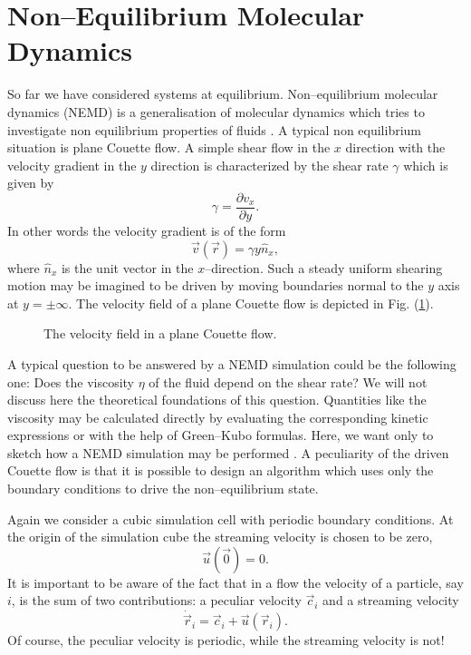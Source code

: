 \section{Non--Equilibrium Molecular Dynamics}
So far we have considered systems at equilibrium. Non--equilibrium molecular
dynamics (NEMD) is a generalisation of molecular dynamics which tries to
investigate non equilibrium properties of fluids \cite{EvansNEMD}. 
A typical non equilibrium
situation is plane Couette flow. A simple shear flow in the $x$ direction with
the velocity gradient in the $y$ direction 
is characterized by the shear rate $\gamma$ which is given by
\begin{displaymath}
  \gamma = \frac{\partial v_x}{\partial y}.
\end{displaymath}
In other words the velocity gradient is of the form
\begin{displaymath}
  \vec{v}(\vec{r}) = \gamma y \hat{n}_x,
\end{displaymath}
where $\hat{n}_x$ is the unit vector in the $x$--direction. Such a steady
uniform shearing motion 
may be imagined to be driven by moving boundaries normal to the $y$
axis  at $y = \pm \infty$. The velocity field
of a plane Couette flow is depicted in Fig. (\ref{Fig:CouetteFlow}).

\begin{figure}[htbp]
  \begin{center}
    
    \caption{The velocity field in a plane Couette flow.}
    \label{Fig:CouetteFlow}
  \end{center}
\end{figure}

A typical question to be answered by a NEMD simulation could be the following
one: Does the viscosity $\eta$ of the fluid depend on the shear rate? We will
not discuss here the theoretical foundations of this question. Quantities like
the viscosity  may be calculated directly by evaluating the corresponding
kinetic expressions or with the help of Green--Kubo formulas. Here, we want
only to sketch how a NEMD simulation may be performed \cite{Evans}.
A peculiarity of the driven Couette flow is that it is possible to design an
algorithm which uses only the boundary conditions to drive the
non--equilibrium state.

Again we consider a cubic simulation cell with periodic boundary conditions.
At the   origin of the simulation cube the streaming velocity is chosen to be
zero, 
\begin{displaymath}
  \vec{u}(\vec{0}) = 0.
\end{displaymath}
It is important to be aware of the fact that in a flow the velocity of a
particle, say $i$, is the sum of two contributions: a peculiar velocity
$\vec{c}_i$  and a streaming velocity
\begin{displaymath}
  \dot{\vec{r}}_i = \vec{c}_i + \vec{u}(\vec{r}_i).
\end{displaymath}
Of course, the peculiar velocity is periodic, while the streaming velocity is
not! 

